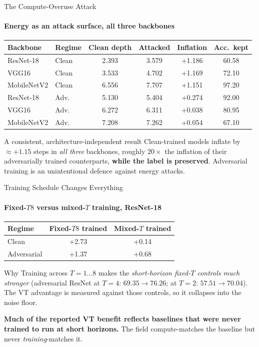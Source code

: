 \documentclass[aspectratio=169,11pt]{beamer}
\newcommand{\ATK}[1]{\textcolor{catk}{#1}}
\begin{document}
\begin{frame}{The Compute-Overuse Attack}\framesubtitle{Energy as an attack surface, all three backbones}
\centering\small
\begin{tabular}{llS[table-format=1.3]S[table-format=1.3]S[table-format=+1.3]S[table-format=2.2]}
\toprule
Backbone & Regime & {Clean depth} & {\ATK{Attacked}} & {Inflation} & {Acc.\ kept} \\
\midrule
ResNet-18   & Clean & 2.393 & 3.579 & +1.186 & 60.58 \\
VGG16       & Clean & 3.533 & 4.702 & +1.169 & 72.10 \\
MobileNetV2 & Clean & 6.556 & 7.707 & +1.151 & 97.20 \\
\midrule
ResNet-18   & Adv.  & 5.130 & 5.404 & +0.274 & 92.00 \\
VGG16       & Adv.  & 6.272 & 6.311 & +0.038 & 80.95 \\
MobileNetV2 & Adv.  & 7.208 & 7.262 & +0.054 & 67.10 \\
\bottomrule
\end{tabular}
\vspace{0.4em}
\begin{alertblock}{A consistent, architecture-independent result}
\small Clean-trained models inflate by $\approx +1.15$ steps in \emph{all three}
backbones, roughly $20\times$ the inflation of their adversarially trained counterparts,
\textbf{while the label is preserved}. Adversarial training is an unintentional defence
against energy attacks.
\end{alertblock}
\end{frame}

\begin{frame}{Training Schedule Changes Everything}\framesubtitle{Fixed-$T8$ versus mixed-$T$ training, ResNet-18}
\centering\small
\begin{tabular}{lS[table-format=+1.2]S[table-format=+1.2]}
\toprule
Regime & {Fixed-$T8$ trained} & {Mixed-$T$ trained} \\
\midrule
Clean       & +2.73 & +0.14 \\
Adversarial & +1.37 & +0.68 \\
\bottomrule
\end{tabular}
\vspace{0.6em}
\begin{block}{Why}
\small Training across $T=1 \ldots 8$ makes the \emph{short-horizon fixed-$T$ controls
much stronger} (adversarial ResNet at $T{=}4$: $69.35 \rightarrow 76.26$; at $T{=}2$:
$57.51 \rightarrow 70.04$). The VT advantage is measured against those controls, so it
collapses into the noise floor.
\end{block}
\begin{alertblock}{}
\small \textbf{Much of the reported VT benefit reflects baselines that were never
trained to run at short horizons.} The field compute-matches the baseline but never
\emph{training}-matches it.
\end{alertblock}
\end{frame}
\end{document}
